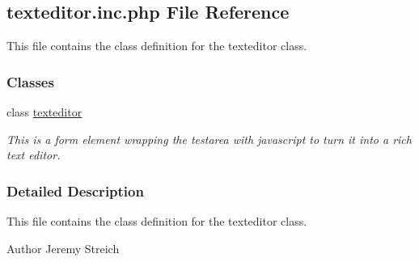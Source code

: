 \hypertarget{texteditor_8inc_8php}{\subsection{texteditor.\-inc.\-php File Reference}
\label{texteditor_8inc_8php}
}


This file contains the class definition for the texteditor class.  


\subsubsection*{Classes}
\begin{DoxyCompactItemize}
\item 
class \hyperlink{classtexteditor}{texteditor}
\begin{DoxyCompactList}\small\item\em This is a form element wrapping the testarea with javascript to turn it into a rich text editor. \end{DoxyCompactList}\end{DoxyCompactItemize}


\subsubsection{Detailed Description}
This file contains the class definition for the texteditor class. \begin{DoxyAuthor}{Author}
Jeremy Streich 
\end{DoxyAuthor}
